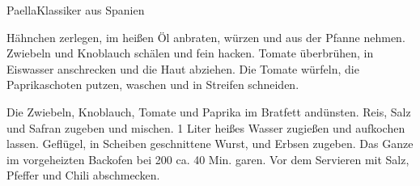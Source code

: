 \begin{recipe}{Paella}{Klassiker aus Spanien}
  \label{Paella}
  \inglist

  \steps
  Hähnchen zerlegen, im heißen Öl anbraten, würzen und aus der Pfanne nehmen. Zwiebeln
  und Knoblauch schälen und fein hacken. Tomate überbrühen, in Eiswasser anschrecken und
  die Haut abziehen. Die Tomate würfeln, die Paprikaschoten putzen, waschen und in
  Streifen schneiden.

  Die Zwiebeln, Knoblauch, Tomate und Paprika im Bratfett andünsten. Reis, Salz und
  Safran zugeben und mischen. 1 Liter heißes Wasser zugießen und aufkochen lassen.
  Geflügel, in Scheiben geschnittene Wurst, und Erbsen zugeben. Das Ganze im vorgeheizten
  Backofen bei 200 \celsius ca. 40 Min. garen. Vor dem Servieren mit Salz, Pfeffer und
  Chili abschmecken.
\end{recipe}


